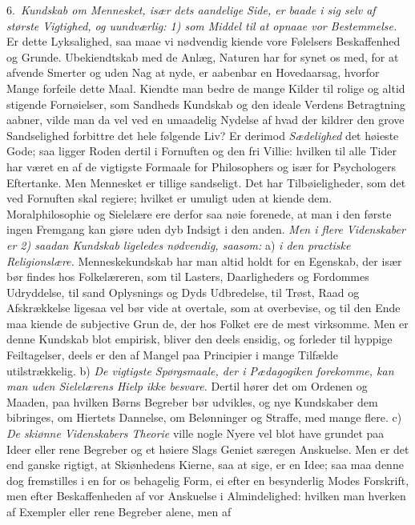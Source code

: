 \documentclass[12pt,a4paper]{article}
\newcommand{\opage}[1]{\marginnote{\footnotesize\textit{[#1]}}}
\begin{document}
6.~\emph{Kundskab om Mennesket, især dets aandelige Side, er baade i sig selv af
største Vigtighed, og uundværlig: 1) som Middel til at opnaae vor Bestemmelse.}
Er dette Lyksalighed, saa maae vi nødvendig kiende vore Følelsers Beskaffenhed og
Grunde. Ubekiendtskab med de Anlæg, Naturen har for%
\opage{6}synet os med, for at afvende Smerter og uden Nag at nyde, er aabenbar en
Hovedaarsag, hvorfor Mange forfeile dette Maal. Kiendte man bedre de mange Kilder
til rolige og altid stigende Fornøielser, som Sandheds Kundskab og den ideale
Verdens Betragtning aabner, vilde man da vel ved en umaadelig Nydelse af hvad der
kildrer den grove Sandselighed forbittre det hele følgende Liv? Er derimod
\emph{Sædelighed} det høieste Gode; saa ligger Roden dertil i Fornuften og den
fri Villie: hvilken til alle Tider har været en af de vigtigste Formaale for
Philosophers og især for Psychologers Eftertanke. Men Mennesket er tillige
sandseligt. Det har Tilbøieligheder, som det ved Fornuften skal regiere; hvilket
er umuligt uden at kiende dem. Moralphilosophie og Sielelære ere derfor saa nøie
forenede, at man i den første ingen Fremgang kan giøre uden dyb Indsigt i den
anden. \emph{Men i flere Videnskaber er 2) saadan Kundskab ligeledes nødvendig,
saasom:} a) \emph{i den practiske Religionslære.} Menneskekundskab har man altid
holdt for en Egenskab, der især bør findes hos Folkelæreren, som til Lasters,
Daarligheders og Fordommes Udryddelse, til sand Oplysnings og Dyds Udbredelse,
til Trøst, Raad og Afskrækkelse ligesaa vel bør vide at overtale, som at
overbevise, og til den Ende maa kiende de subjective Grun%
\opage{7}de, der hos Folket ere de mest virksomme. Men er denne Kundskab blot empirisk,
bliver den deels ensidig, og forleder til hyppige Feiltagelser, deels er den af
Mangel paa Principier i mange Tilfælde utilstrækkelig. b) \emph{De vigtigste
Spørgsmaale, der i Pædagogiken forekomme, kan man uden Sielelærens Hielp ikke
besvare.} Dertil hører det om Ordenen og Maaden, paa hvilken Børns Begreber bør
udvikles, og nye Kundskaber dem bibringes, om Hiertets Dannelse, om Belønninger
og Straffe, med mange flere. c) \emph{De skiønne Videnskabers Theorie} ville nogle
Nyere vel blot have grundet paa Ideer eller rene Begreber og et høiere Slags
Geniet særegen Anskuelse. Men er det end ganske rigtigt, at Skiønhedens Kierne,
saa at sige, er en Idee; saa maa denne dog fremstilles i en for os behagelig Form,
ei efter en besynderlig Modes Forskrift, men efter Beskaffenheden af vor Anskuelse
i Almindelighed: hvilken man hverken af Exempler eller rene Begreber alene, men af
\end{document}
